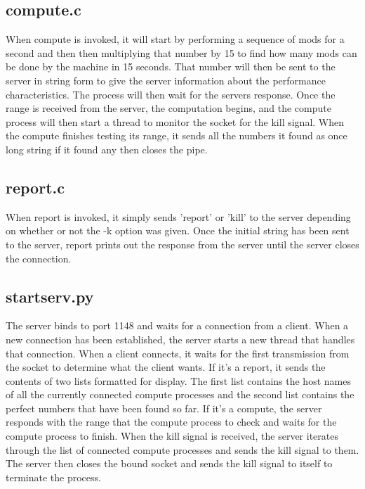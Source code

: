 \documentclass{article}
\begin{document}
\subsection{compute.c}
When compute is invoked, it will start by performing a sequence of mods for a second and then then multiplying that number by 15 to find how many mods can be done by the machine in 15 seconds.  That number will then be sent to the server in string form to give the server information about the performance characteristics.  The process will then wait for the servers response.  Once the range is received from the server, the computation begins, and the compute process will then start a thread to monitor the socket for the kill signal.  When the compute finishes testing its range, it sends all the numbers it found as once long string if it found any then closes the pipe.

\subsection{report.c}
When report is invoked, it simply sends 'report' or 'kill' to the server depending on whether or not the -k option was given.  Once the initial string has been sent to the server, report prints out the response from the server until the server closes the connection.

\subsection{startserv.py}
The server binds to port 1148 and waits for a connection from a client.  When a new connection has been established, the server starts a new thread that handles that connection.  When a client connects, it waits for the first transmission from the socket to determine what the client wants.  If it's a report, it sends the contents of two lists formatted for display.  The first list contains the host names of all the currently connected compute processes and the second list contains the perfect numbers that have been found so far.  If it's a compute, the server responds with the range that the compute process to check and waits for the compute process to finish.  When the kill signal is received, the server iterates through the list of connected compute processes and sends the kill signal to them.  The server then closes the bound socket and sends the kill signal to itself to terminate the process.
\end{document}
